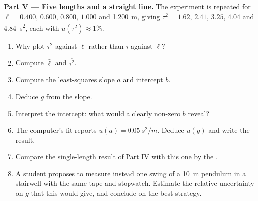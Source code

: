 \begin{problem}
\medskip
\noindent\textbf{Part V --- Five lengths and a straight line.}
The experiment is repeated for $\ell = 0.400$, $0.600$, $0.800$,
$1.000$ and \qty{1.200}{m}, giving $\tau^2 = 1.62$, $2.41$, $3.25$,
$4.04$ and \qty{4.84}{s^2}, each with $u(\tau^2) \approx 1\%$.
\begin{enumerate}[resume]
  \item Why plot $\tau^2$ against $\ell$ rather than $\tau$ against
        $\ell$?
  \item Compute $\bar\ell$ and $\overline{\tau^2}$.
  \item Compute the least-squares slope $a$ and intercept $b$.
  \item Deduce $g$ from the slope.
  \item Interpret the intercept: what would a clearly non-zero $b$
        reveal?
  \item The computer's fit reports $u(a) = \qty{0.05}{s^2/m}$. Deduce
        $u(g)$ and write the result.
  \item Compare the single-length result of Part IV with this one by
        the .
  \item A student proposes to measure instead one swing of a
        \qty{10}{m} pendulum in a stairwell with the same tape and
        stopwatch. Estimate the relative uncertainty on $g$ that this
        would give, and conclude on the best strategy.
\end{enumerate}
\end{problem}
